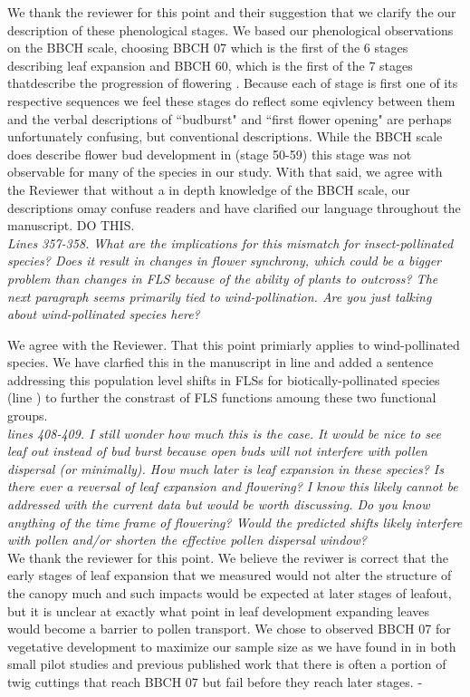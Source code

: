 \documentclass[11pt]{article}
\begin{document}
We thank the reviewer for this point and their suggestion that we clarify the our description of these phenological stages. We based our phenological observations on the BBCH scale, choosing BBCH 07 which is the first of the 6 stages describing leaf expansion and BBCH 60, which is the first of the 7 stages thatdescribe the progression of flowering \citep{}. Because each of stage is first one of its respective sequences we feel these stages do reflect some eqivlency between them and the verbal descriptions of ``budburst" and ``first flower opening" are perhaps unfortunately confusing, but conventional descriptions. While the BBCH scale does describe flower bud development in (stage 50-59) this stage was not observable for many of the species in our study. With that said, we agree with the Reviewer that without a in depth knowledge of the BBCH scale, our descriptions omay confuse readers and have clarified our language throughout the manuscript. DO THIS.\\




\emph{Lines  357-358. What are the implications for this mismatch for insect-pollinated species? Does it result in changes in flower synchrony, which could be a bigger problem than changes in FLS because of the ability of plants to outcross? The next paragraph seems primarily tied to wind-pollination. Are you just talking about wind-pollinated species here?}
 
We agree with the Reviewer. That this point primiarly applies to wind-pollinated species. We have clarfied this in the manuscript in line  and added a sentence addressing this population level shifts in FLSs for biotically-pollinated species (line ) to further the constrast of FLS functions amoung these two functional groups. \\
 
\emph{lines 408-409. I still wonder how much this is the case. It would be nice to see leaf out instead of bud burst because open buds will not interfere with pollen dispersal (or minimally). How much later is leaf expansion in these species? Is there ever a reversal of leaf expansion and flowering? I know this likely cannot be addressed with the current data but would be worth discussing. Do you know anything of the time frame of flowering? Would the predicted shifts likely interfere with pollen and/or shorten the effective pollen dispersal window?}\\

We thank the reviewer for this point. We believe the reviwer is correct that the early stages of leaf expansion that we measured would not alter the structure of the canopy much and such impacts would be expected at later stages of leafout, but it is unclear at exactly what point in leaf development expanding leaves would become a barrier to pollen transport. We chose to observed BBCH 07 for vegetative development to maximize our sample size as we have found in in both small pilot studies and previous published work that there is often a portion of twig cuttings that reach BBCH 07 but fail before they reach later stages.
-
\end{document}
